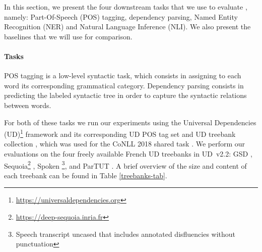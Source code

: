 In this section, we present the four downstream tasks that we use to evaluate \camembert, namely: Part-Of-Speech (POS) tagging, dependency parsing, Named Entity Recognition (NER) and Natural Language Inference (NLI). We also present the baselines that we will use for comparison.


\paragraph{Tasks} POS tagging is a low-level syntactic task, which consists in assigning to each word its corresponding grammatical category. Dependency parsing consists in predicting the labeled syntactic tree in order to capture the syntactic relations between words.

For both of these tasks we run our experiments using the Universal Dependencies (UD)\footnote{\url{https://universaldependencies.org}} framework and its corresponding UD POS tag set \citep{petrov2011universal} and UD treebank collection \citep{ud22}, which was used for the CoNLL 2018 shared task \citep{seker2018universal}. We perform our evaluations on the four freely available French UD treebanks in UD~v2.2: GSD \citep{mcdonald13}, Sequoia\footnote{\url{https://deep-sequoia.inria.fr}} \citep{candito2012le,candito2014deep}, Spoken \citep{lacheret14,bawden14}\footnote{Speech transcript uncased that includes annotated disfluencies without punctuation}, and ParTUT \cite{sanguinetti2015PartTUT}. A brief overview of the size and content of each treebank can be found in Table \ref{treebanks-tab}.

